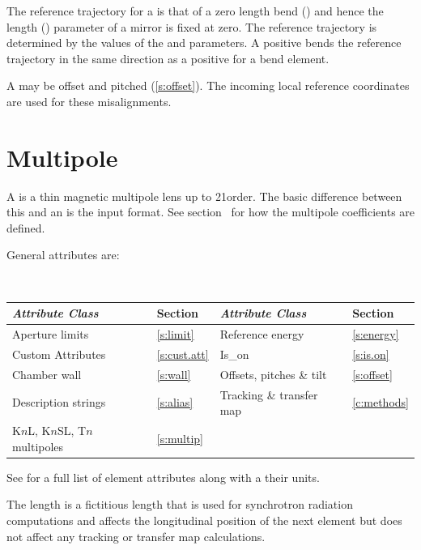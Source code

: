 {The reference trajectory for a
 is that of a zero length bend () and
hence the length () parameter of a mirror is fixed at zero. The
reference trajectory is determined by the values of the
 and  parameters. A positive 
bends the reference trajectory in the same direction as a positive
 for a bend element.

A  may be offset and pitched (\ref{s:offset}). The incoming
local reference coordinates are used for these misalignments.

\section{Multipole}
\label{s:mult}

A  is a thin magnetic multipole lens up to 21\St order. The basic
difference between this and an  is the input
format. See section~ for how the multipole coefficients
are defined.

General  attributes are:
\begin{center}
\tt 
\begin{tabular}{llll} \toprule
  {\sl Attribute Class}          & Section           & {\sl Attribute Class}      & Section         \\ \midrule
  Aperture limits                & \ref{s:limit}     & Reference energy           & \ref{s:energy}  \\
  Custom Attributes              & \ref{s:cust.att}  & Is_on                      & \ref{s:is.on}   \\ 
  Chamber wall                   & \ref{s:wall}      & Offsets, pitches \& tilt   & \ref{s:offset}  \\
  Description strings            & \ref{s:alias}     & Tracking \& transfer map   & \ref{c:methods} \\ 
  K$n$L, K$n$SL, T$n$ multipoles & \ref{s:multip}    &                            &                 \\
  \bottomrule
\end{tabular}
\end{center}
\toffset
See  for a full list of element attributes along with a their units.

The length  is a fictitious length that is used for synchrotron
radiation computations and affects the longitudinal position of the
next element but does not affect any tracking or transfer map
calculations.

}
